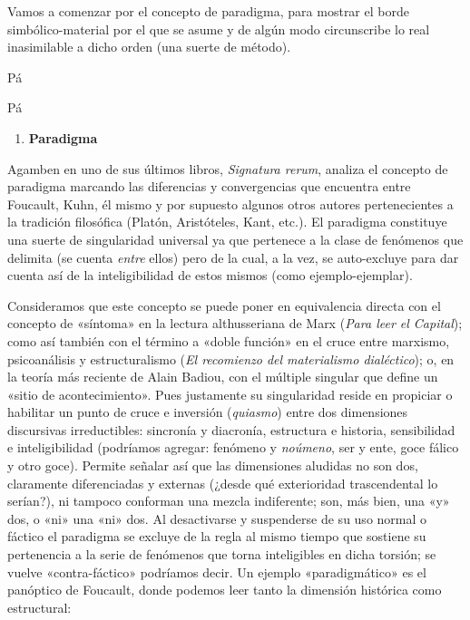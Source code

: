 Vamos a comenzar por el concepto de paradigma, para mostrar el borde simbólico-material por el que se asume y de algún modo circunscribe lo real inasimilable a dicho orden (una suerte de método).

Pá

Pá

\begin{enumerate}
\def\labelenumi{\arabic{enumi}.}
\item
  \textbf{Paradigma}
\end{enumerate}

Agamben en uno de sus últimos libros, \emph{Signatura rerum}, analiza el concepto de paradigma marcando las diferencias y convergencias que encuentra entre Foucault, Kuhn, él mismo y por supuesto algunos otros autores pertenecientes a la tradición filosófica (Platón, Aristóteles, Kant, etc.). El paradigma constituye una suerte de singularidad universal ya que pertenece a la clase de fenómenos que delimita (se cuenta \emph{entre} ellos) pero de la cual, a la vez, se auto-excluye para dar cuenta así de la inteligibilidad de estos mismos (como ejemplo-ejemplar).

Consideramos que este concepto se puede poner en equivalencia directa con el concepto de «síntoma» en la lectura althusseriana de Marx (\emph{Para leer el Capital}); como así también con el término a «doble función» en el cruce entre marxismo, psicoanálisis y estructuralismo (\emph{El recomienzo del materialismo dialéctico}); o, en la teoría más reciente de Alain Badiou, con el múltiple singular que define un «sitio de acontecimiento». Pues justamente su singularidad reside en propiciar o habilitar un punto de cruce e inversión (\emph{quiasmo}) entre dos dimensiones discursivas irreductibles: sincronía y diacronía, estructura e historia, sensibilidad e inteligibilidad (podríamos agregar: fenómeno y \emph{noúmeno}, ser y ente, goce fálico y otro goce). Permite señalar así que las dimensiones aludidas no son dos, claramente diferenciadas y externas (¿desde qué exterioridad trascendental lo serían?), ni tampoco conforman una mezcla indiferente; son, más bien, una «y» dos, o «ni» una «ni» dos. Al desactivarse y suspenderse de su uso normal o fáctico el paradigma se excluye de la regla al mismo tiempo que sostiene su pertenencia a la serie de fenómenos que torna inteligibles en dicha torsión; se vuelve «contra-fáctico» podríamos decir. Un ejemplo «paradigmático» es el panóptico de Foucault, donde podemos leer tanto la dimensión histórica como estructural:

